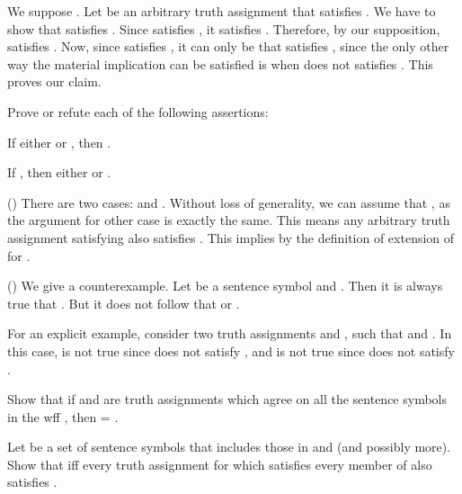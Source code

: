 		\qquad
		We suppose . Let  be an arbitrary truth assignment that satisfies . We have to show that  satisfies . Since  satisfies , it satisfies . Therefore, by our supposition,  satisfies . Now, since  satisfies , it can only be that  satisfies , since the only other way the material implication can be satisfied is when  does not satisfies . This proves our claim.
	\stopsolution

	\startexercise [title={Enderton, 1.2.5}]
		Prove or refute each of the following assertions:
		\startitemize [a, joinedup]
			\item  If either  or , then .
			\item  If , then either  or .
		\stopitemize
	\stopexercise
	\startsolution
		\startitemize [a]
			\item  ()\qquad
				There are two cases:  and . Without loss of generality, we can assume that , as the argument for other case is exactly the same. This means any arbitrary truth assignment  satisfying  also satisfies . This implies  by the definition of extension of  for .

			\item  ()\qquad
				We give a counterexample. Let  be a sentence symbol and . Then it is always true that . But it does not follow that  or .

				For an explicit example, consider two truth assignments  and , such that  and . In this case,  is not true since  does not satisfy , and  is not true since  does not satisfy .
		\stopitemize
	\stopsolution

	\page
	\startexercise [title={Enderton, 1.2.6}]
		\startitemize [a, joinedup]

			\item  Show that if  and  are truth assignments which agree on all the sentence symbols in the wff , then  = .
			
			\item  Let  be a set of sentence symbols that includes those in  and  (and possibly more). Show that  iff every truth assignment for  which satisfies every member of  also satisfies .

